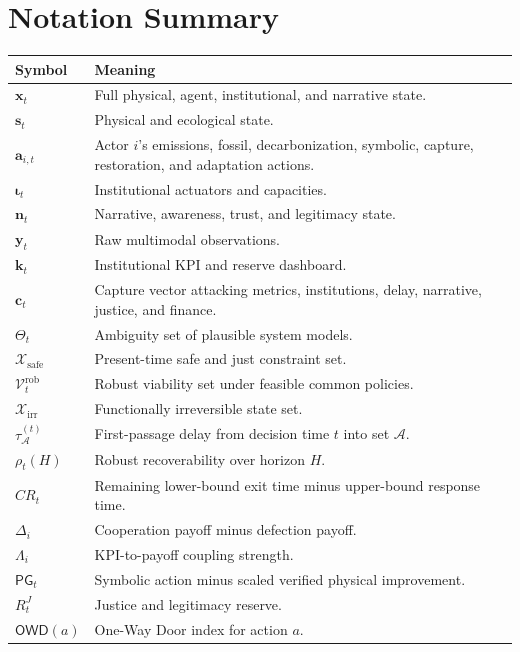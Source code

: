 \documentclass[11pt,a4paper]{article}
\numberwithin{equation}{section}
\theoremstyle{definition}
\theoremstyle{plain}
\theoremstyle{remark}
\newcommand{\safe}{\mathcal{X}_{\mathrm{safe}}}
\newcommand{\irrev}{\mathcal{X}_{\mathrm{irr}}}
\newcommand{\state}{\bm{x}}
\newcommand{\kpi}{\bm{k}}
\newcommand{\action}{\bm{a}}
\newcommand{\capture}{\bm{c}}
\newcommand{\inst}{\bm{\iota}}
\newcommand{\narr}{\bm{n}}
\begin{document}
\appendix
\section{Notation Summary}

\begin{longtable}{@{}L{0.20\textwidth}L{0.72\textwidth}@{}}
\toprule
\textbf{Symbol} & \textbf{Meaning} \\
\midrule
$\state_t$ & Full physical, agent, institutional, and narrative state. \\
$\bm{s}_t$ & Physical and ecological state. \\
$\action_{i,t}$ & Actor $i$'s emissions, fossil, decarbonization, symbolic, capture, restoration, and adaptation actions. \\
$\inst_t$ & Institutional actuators and capacities. \\
$\narr_t$ & Narrative, awareness, trust, and legitimacy state. \\
$\bm y_t$ & Raw multimodal observations. \\
$\kpi_t$ & Institutional KPI and reserve dashboard. \\
$\capture_t$ & Capture vector attacking metrics, institutions, delay, narrative, justice, and finance. \\
$\Theta_t$ & Ambiguity set of plausible system models. \\
$\safe$ & Present-time safe and just constraint set. \\
$\mathcal V_t^{\mathrm{rob}}$ & Robust viability set under feasible common policies. \\
$\irrev$ & Functionally irreversible state set. \\
$\tau_{\mathcal A}^{(t)}$ & First-passage delay from decision time $t$ into set $\mathcal A$. \\
$\rho_t(H)$ & Robust recoverability over horizon $H$. \\
$CR_t$ & Remaining lower-bound exit time minus upper-bound response time. \\
$\Delta_i$ & Cooperation payoff minus defection payoff. \\
$\Lambda_i$ & KPI-to-payoff coupling strength. \\
$\mathsf{PG}_t$ & Symbolic action minus scaled verified physical improvement. \\
$R_t^J$ & Justice and legitimacy reserve. \\
$\mathsf{OWD}(a)$ & One-Way Door index for action $a$. \\
\bottomrule
\end{longtable}
\end{document}
